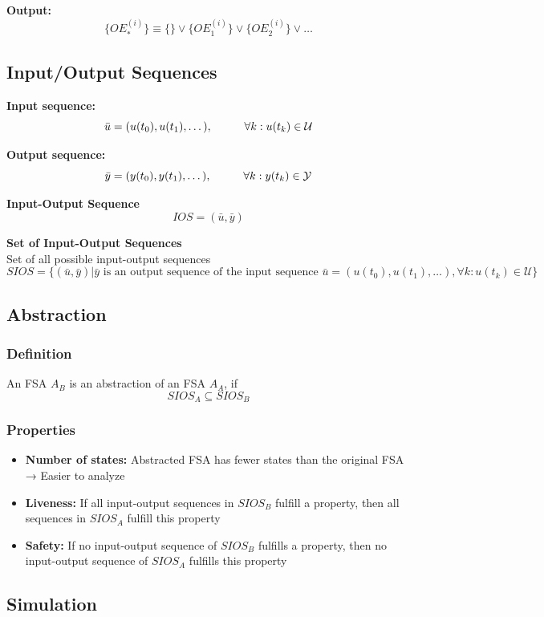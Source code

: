 \documentclass[10pt,a4paper]{article}
\newcommand{\tab}[1][1]{\hspace*{#1cm}}
\begin{document}
\textbf{Output:}
$$
	\{OE^{(i)}_*\} ≡ \{\} \lor \{OE^{(i)}_1\} \lor \{OE^{(i)}_2\} \lor \dots
$$

\subsection{Input/Output Sequences}
\textbf{Input sequence:} \\
$$
	\bar u = (u(t_0), u(t_1), \dots), \tab \forall k : u(t_k) \in \mathcal U
$$

\textbf{Output sequence:} \\
$$
	\bar y = (y(t_0), y(t_1), \dots), \tab \forall k : y(t_k) \in \mathcal Y
$$

\textbf{Input-Output Sequence}
$$
	IOS = (\bar u, \bar y)
$$

\textbf{Set of Input-Output Sequences} \\
Set of all possible input-output sequences
$$
	SIOS = \{(\bar u, \bar y) | \bar y \text{ is an output sequence of the input sequence } \bar u = (u(t_0), u(t_1), \dots), \forall k : u(t_k) \in \mathcal U\}
$$

\subsection{Abstraction}
\subsubsection{Definition}
An FSA $A_B$ is an abstraction of an FSA $A_A$, if
$$
	SIOS_A \subseteq SIOS_B
$$

\subsubsection{Properties}
\begin{itemize}
	\item \textbf{Number of states:} Abstracted FSA has fewer states than the original FSA → Easier to analyze
	\item \textbf{Liveness:} If all input-output sequences in $SIOS_B$ fulfill a property, then all sequences in $SIOS_A$ fulfill this property
	\item \textbf{Safety:} If no input-output sequence of $SIOS_B$ fulfills a property, then no input-output sequence of $SIOS_A$ fulfills this property
\end{itemize}

\subsection{Simulation}
\end{document}
